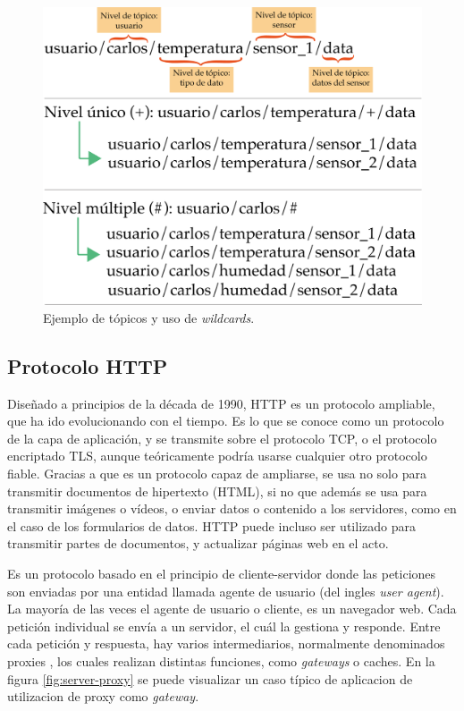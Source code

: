 \begin{figure}[htpb]
	\centering
	\includegraphics[scale=.38]{./Figures/esquema-wildcard.png}
	\caption{Ejemplo de tópicos y uso de \textit{wildcards}.}
	\label{fig:mqtt-wildcards}
\end{figure}



\subsection{Protocolo HTTP}

Diseñado a principios de la década de 1990, HTTP es un protocolo ampliable, que ha ido evolucionando con el tiempo. Es lo que se conoce como un protocolo de la capa de aplicación, y se transmite sobre el protocolo TCP, o el protocolo encriptado TLS, aunque teóricamente podría usarse cualquier otro protocolo fiable. Gracias a que es un protocolo capaz de ampliarse, se usa no solo para transmitir documentos de hipertexto (HTML), si no que además se usa para transmitir imágenes o vídeos, o enviar datos o contenido a los servidores, como en el caso de los formularios de datos. HTTP puede incluso ser utilizado para transmitir partes de documentos, y actualizar páginas web en el acto.

Es un protocolo basado en el principio de cliente-servidor donde las peticiones son enviadas por una entidad llamada agente de usuario (del ingles \textit{user agent}). La mayoría de las veces el agente de usuario o cliente,  es un navegador web. Cada petición individual se envía a un servidor, el cuál la gestiona y responde. Entre cada petición y respuesta, hay varios intermediarios, normalmente denominados proxies \citep{WEBSITE:18} , los cuales realizan distintas funciones, como \textit{gateways} o caches.  En la figura  \ref{fig:server-proxy} se puede visualizar un caso típico de aplicacion de utilizacion de proxy como \textit{gateway}.

